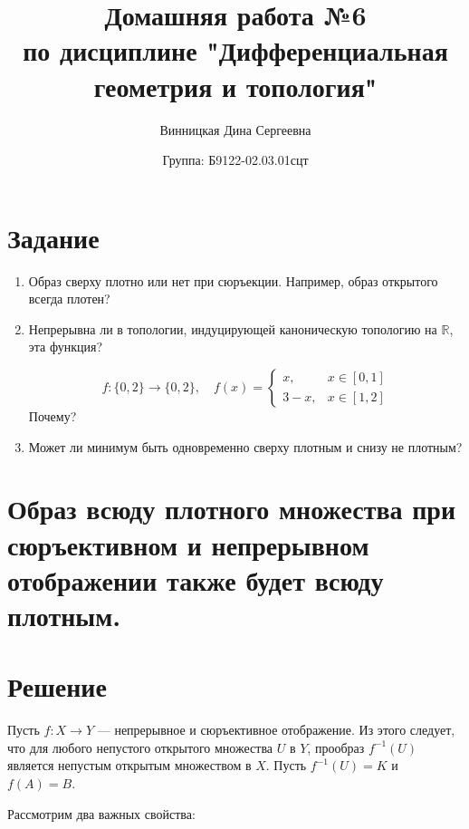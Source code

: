 \documentclass{article}
\title{\vspace{-1cm}Домашняя работа №6 \\ по дисциплине "Дифференциальная геометрия и топология"}
\author{Винницкая Дина Сергеевна}
\date{Группа: Б9122-02.03.01сцт}
\begin{document}
	
	\maketitle


        \section{Задание}

        \begin{enumerate}
            \item Образ сверху плотно или нет при сюръекции. Например, образ открытого всегда плотен?
            
            \item Непрерывна ли в топологии, индуцирующей каноническую топологию на $\mathbb{R}$, эта функция?
            
            \[
            f: \{0, 2\} \to \{0, 2\}, \quad f(x) = 
            \begin{cases}
                x, & x \in [0, 1] \\
                3 - x, & x \in [1, 2]
            \end{cases}
            \]
            Почему?
            
            \item Может ли минимум быть одновременно сверху плотным и снизу не плотным?
        \end{enumerate}

        \section{Образ всюду плотного множества при сюръективном и непрерывном отображении также будет всюду плотным.}

        
        \section*{Решение}
        Пусть $f : X \to Y$ — непрерывное и сюръективное отображение.  
        Из этого следует, что для любого непустого открытого множества $U$ в $Y$, прообраз $f^{-1}(U)$ является непустым открытым множеством в $X$.  
        Пусть $f^{-1}(U) = K$ и $f(A) = B$.
        
        Рассмотрим два важных свойства:
        
\end{document}
